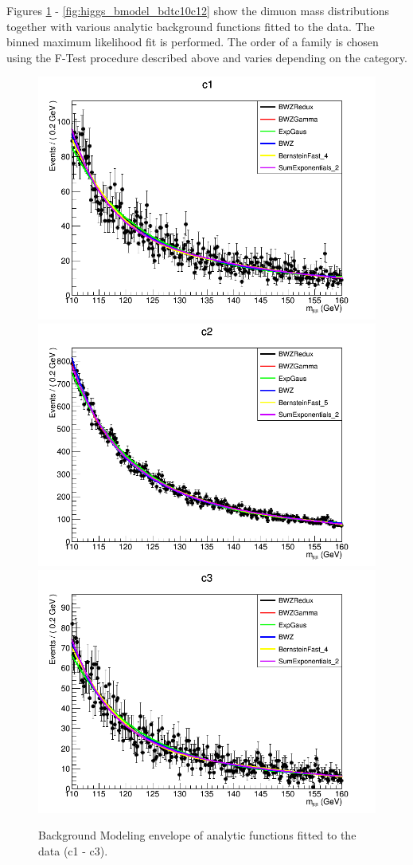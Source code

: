 Figures \ref{fig:higgs_bmodel_bdtc1c3} - \ref{fig:higgs_bmodel_bdtc10c12} show the dimuon mass distributions together with various analytic background functions fitted to the data. The binned maximum likelihood fit is performed. The order of a family is chosen using the F-Test procedure described above and varies depending on the category.
\begin{figure}[htbp]
  \centering
  \includegraphics[width=0.65\linewidth]{figures/ch_higgs/backgroundmodel/uf_bdt/backgroundFits__c1__bkgModels.png}\\
  \includegraphics[width=0.65\linewidth]{figures/ch_higgs/backgroundmodel/uf_bdt/backgroundFits__c2__bkgModels.png}\\
  \includegraphics[width=0.65\linewidth]{figures/ch_higgs/backgroundmodel/uf_bdt/backgroundFits__c3__bkgModels.png}
  \caption{Background Modeling envelope of analytic functions fitted to the data (c1 - c3).}
  \label{fig:higgs_bmodel_bdtc1c3}
\end{figure}
